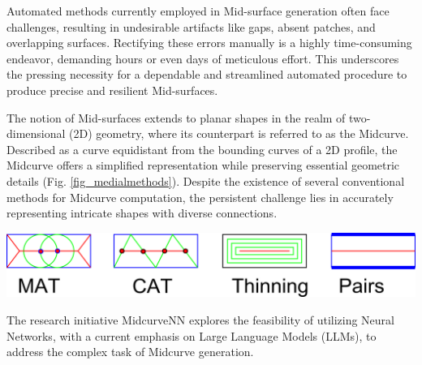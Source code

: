 \documentclass[10pt, conference]{IEEEtran}
\begin{document}
Automated methods currently employed in Mid-surface generation often face challenges, resulting in undesirable artifacts like gaps, absent patches, and overlapping surfaces. Rectifying these errors manually is a highly time-consuming endeavor, demanding hours or even days of meticulous effort. This underscores the pressing necessity for a dependable and streamlined automated procedure to produce precise and resilient Mid-surfaces.

The notion of Mid-surfaces extends to planar shapes in the realm of two-dimensional (2D) geometry, where its counterpart is referred to as the Midcurve. Described as a curve equidistant from the bounding curves of a 2D profile, the Midcurve offers a simplified representation while preserving essential geometric details (Fig. \ref{fig_medialmethods}). Despite the existence of several conventional methods for Midcurve computation, the persistent challenge lies in accurately representing intricate shapes with diverse connections.

    \begin{center}
	\includegraphics[width=\linewidth]{images/MedialMethodsOnlyShort}
	 \cite{midcurvenn2022}
	\label{fig_medialmethods}
    \end{center}
	
%
	
The research initiative MidcurveNN \cite{midcurvenngithub} explores the feasibility of utilizing Neural Networks, with a current emphasis on Large Language Models (LLMs), to address the complex task of Midcurve generation.

\end{document}
